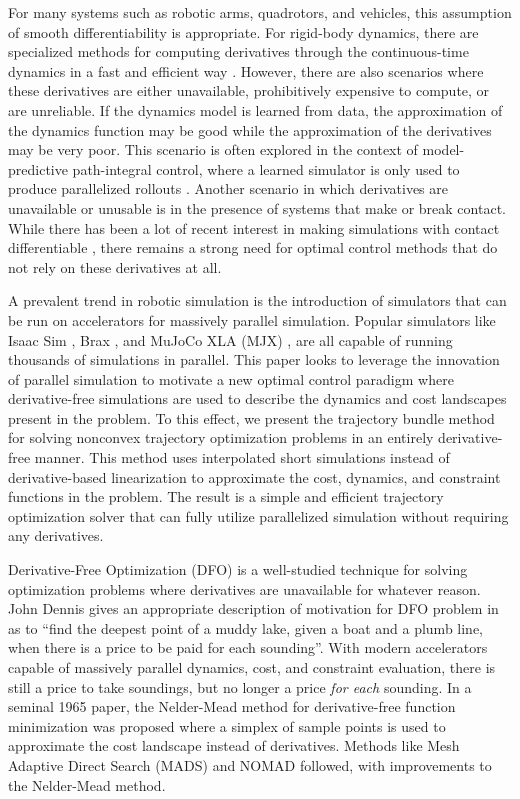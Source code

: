 For many systems such as robotic arms, quadrotors, and vehicles, this assumption of smooth differentiability is appropriate. For rigid-body dynamics, there are specialized methods for computing derivatives through the continuous-time dynamics in a fast and efficient way \cite{featherstone1987}. However, there are also scenarios where these derivatives are either unavailable, prohibitively expensive to compute, or are unreliable. If the dynamics model is learned from data, the approximation of the dynamics function may be good while the approximation of the derivatives may be very poor. This scenario is often explored in the context of model-predictive path-integral control, where a learned simulator is only used to produce parallelized rollouts \cite{williams2016, wagener2019}. Another scenario in which derivatives are unavailable or unusable is in the presence of systems that make or break contact. While there has been a lot of recent interest in making simulations with contact differentiable \cite{freeman2021, newbury2024, pang2023, tracy2023b, suh2022a, howell2022}, there remains a strong need for optimal control methods that do not rely on these derivatives at all.  

A prevalent trend in robotic simulation is the introduction of simulators that can be run on accelerators for massively parallel simulation. Popular simulators like Isaac Sim \cite{makoviychuk2021, mittal2023}, Brax \cite{freeman2021}, and MuJoCo XLA (MJX) \cite{todorov2012}, are all capable of running thousands of simulations in parallel. This paper looks to leverage the innovation of parallel simulation to motivate a new optimal control paradigm where derivative-free simulations are used to describe the dynamics and cost landscapes present in the problem. To this effect, we present the trajectory bundle method for solving nonconvex trajectory optimization problems in an entirely derivative-free manner. This method uses interpolated short simulations instead of derivative-based linearization to approximate the cost, dynamics, and constraint functions in the problem. The result is a simple and efficient trajectory optimization solver that can fully utilize parallelized simulation without requiring any derivatives. 

Derivative-Free Optimization (DFO) is a well-studied technique for solving optimization problems where derivatives are unavailable for whatever reason. John Dennis gives an appropriate description of motivation for DFO problem in \cite{powell1994} as to ``find the deepest point of a muddy lake,
given a boat and a plumb line, when there is a price to be paid for each sounding''. With modern accelerators capable of massively parallel dynamics, cost, and constraint evaluation, there is still a price to take soundings, but no longer a price \textit{for each} sounding.   In a seminal 1965 paper, the Nelder-Mead method for derivative-free function minimization was proposed where a simplex of sample points is used to approximate the cost landscape instead of derivatives. Methods like Mesh Adaptive Direct Search (MADS) \cite{audet2006} and NOMAD \cite{ledigabel2011, audet2021} followed, with improvements to the Nelder-Mead method. 

